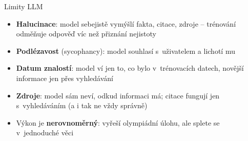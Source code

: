 
\begin{frame}{Limity LLM}

    \begin{itemize}[<+->]

        \item \textbf{Halucinace}: model sebejistě vymýšlí fakta, citace,
            zdroje -- trénování odměňuje odpověď víc než přiznání nejistoty
            {\footnotesize\citep{kalai2025hallucinate}}

        \item \textbf{Podlézavost} (sycophancy): model souhlasí s~uživatelem
            a lichotí mu {\footnotesize\citep{sharma2024sycophancy}}

        \item \textbf{Datum znalostí}: model ví jen to, co bylo v~trénovacích
            datech, novější informace jen přes vyhledávání

        \item \textbf{Zdroje}: model sám neví, odkud informaci má; citace
            fungují jen s~vyhledáváním (a i tak ne vždy správně)

        \item Výkon je \textbf{nerovnoměrný}: vyřeší olympiádní úlohu, ale
            splete se v~jednoduché věci

    \end{itemize}

\end{frame}



